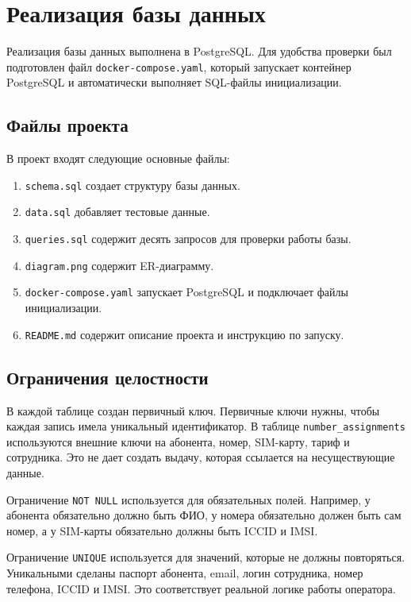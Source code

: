 \chapter{Реализация базы данных}

Реализация базы данных выполнена в PostgreSQL. Для удобства проверки был подготовлен файл \texttt{docker-compose.yaml}, который запускает контейнер PostgreSQL и автоматически выполняет SQL-файлы инициализации.

\section{Файлы проекта}

В проект входят следующие основные файлы:

\begin{enumerate}
    \item \texttt{schema.sql} создает структуру базы данных.
    \item \texttt{data.sql} добавляет тестовые данные.
    \item \texttt{queries.sql} содержит десять запросов для проверки работы базы.
    \item \texttt{diagram.png} содержит ER-диаграмму.
    \item \texttt{docker-compose.yaml} запускает PostgreSQL и подключает файлы инициализации.
    \item \texttt{README.md} содержит описание проекта и инструкцию по запуску.
\end{enumerate}

\section{Ограничения целостности}

В каждой таблице создан первичный ключ. Первичные ключи нужны, чтобы каждая запись имела уникальный идентификатор. В таблице \texttt{number\_assignments} используются внешние ключи на абонента, номер, SIM-карту, тариф и сотрудника. Это не дает создать выдачу, которая ссылается на несуществующие данные.

Ограничение \texttt{NOT NULL} используется для обязательных полей. Например, у абонента обязательно должно быть ФИО, у номера обязательно должен быть сам номер, а у SIM-карты обязательно должны быть ICCID и IMSI.

Ограничение \texttt{UNIQUE} используется для значений, которые не должны повторяться. Уникальными сделаны паспорт абонента, email, логин сотрудника, номер телефона, ICCID и IMSI. Это соответствует реальной логике работы оператора.

